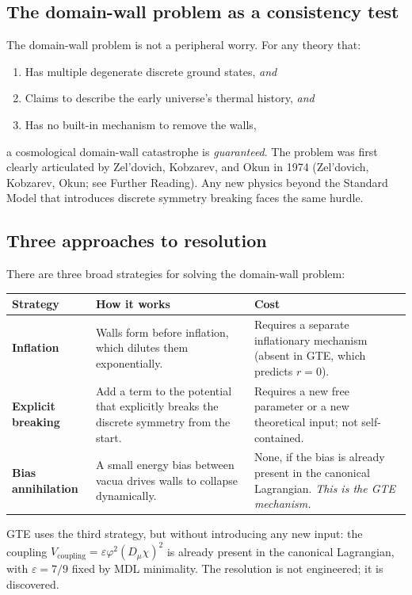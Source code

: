 \documentclass[11pt,a4paper]{article}
\begin{document}
\subsection{The domain-wall problem as a consistency test}

The domain-wall problem is not a peripheral worry.
For any theory that:
\begin{enumerate}
\item Has multiple degenerate discrete ground states, \emph{and}
\item Claims to describe the early universe's thermal history, \emph{and}
\item Has no built-in mechanism to remove the walls,
\end{enumerate}
\noindent
a cosmological domain-wall catastrophe is \emph{guaranteed}.
The problem was first clearly articulated by Zel'dovich, Kobzarev, and Okun
in 1974 (Zel'dovich, Kobzarev, Okun; see Further Reading).
Any new physics beyond the Standard Model that introduces discrete symmetry
breaking faces the same hurdle.

\subsection{Three approaches to resolution}

There are three broad strategies for solving the domain-wall problem:

\begin{center}
\begin{tabular}{lP{5.0cm}P{5.0cm}}
\toprule
\textbf{Strategy} & \textbf{How it works} & \textbf{Cost} \\
\midrule
\textbf{Inflation} & Walls form before inflation, which dilutes them
  exponentially. & Requires a separate inflationary mechanism (absent in GTE,
  which predicts $r=0$). \\[6pt]
\textbf{Explicit breaking} & Add a term to the potential that explicitly
  breaks the discrete symmetry from the start. & Requires a new free parameter
  or a new theoretical input; not self-contained. \\[6pt]
\textbf{Bias annihilation} & A small energy bias between vacua drives walls to
  collapse dynamically. & None, if the bias is already present in the canonical
  Lagrangian. \emph{This is the GTE mechanism.} \\
\bottomrule
\end{tabular}
\end{center}

\medskip
\noindent
GTE uses the third strategy, but without introducing any new input: the
coupling $V_\mathrm{coupling} = \varepsilon\varphi^2(D_\mu\chi)^2$ is
already present in the canonical Lagrangian, with $\varepsilon = 7/9$
fixed by MDL minimality.
The resolution is not engineered; it is discovered.
\end{document}
